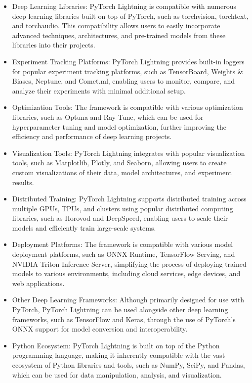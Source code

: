 \documentclass[12pt]{article}
\begin{document}
\begin{itemize}
    \item Deep Learning Libraries: PyTorch Lightning is compatible with numerous deep learning libraries built on top of PyTorch, such as torchvision, torchtext, and torchaudio. This compatibility allows users to easily incorporate advanced techniques, architectures, and pre-trained models from these libraries into their projects.
    \item Experiment Tracking Platforms: PyTorch Lightning provides built-in loggers for popular experiment tracking platforms, such as TensorBoard, Weights \& Biases, Neptune, and Comet.ml, enabling users to monitor, compare, and analyze their experiments with minimal additional setup.
    \item Optimization Tools: The framework is compatible with various optimization libraries, such as Optuna and Ray Tune, which can be used for hyperparameter tuning and model optimization, further improving the efficiency and performance of deep learning projects.
    \item Visualization Tools: PyTorch Lightning integrates with popular visualization tools, such as Matplotlib, Plotly, and Seaborn, allowing users to create custom visualizations of their data, model architectures, and experiment results.
    \item Distributed Training: PyTorch Lightning supports distributed training across multiple GPUs, TPUs, and clusters using popular distributed computing libraries, such as Horovod and DeepSpeed, enabling users to scale their models and efficiently train large-scale systems.
    \item Deployment Platforms: The framework is compatible with various model deployment platforms, such as ONNX Runtime, TensorFlow Serving, and NVIDIA Triton Inference Server, simplifying the process of deploying trained models to various environments, including cloud services, edge devices, and web applications.
    \item Other Deep Learning Frameworks: Although primarily designed for use with PyTorch, PyTorch Lightning can be used alongside other deep learning frameworks, such as TensorFlow and Keras, through the use of PyTorch's ONNX support for model conversion and interoperability.
    \item Python Ecosystem: PyTorch Lightning is built on top of the Python programming language, making it inherently compatible with the vast ecosystem of Python libraries and tools, such as NumPy, SciPy, and Pandas, which can be used for data manipulation, analysis, and visualization.
\end{itemize}
\end{document}
